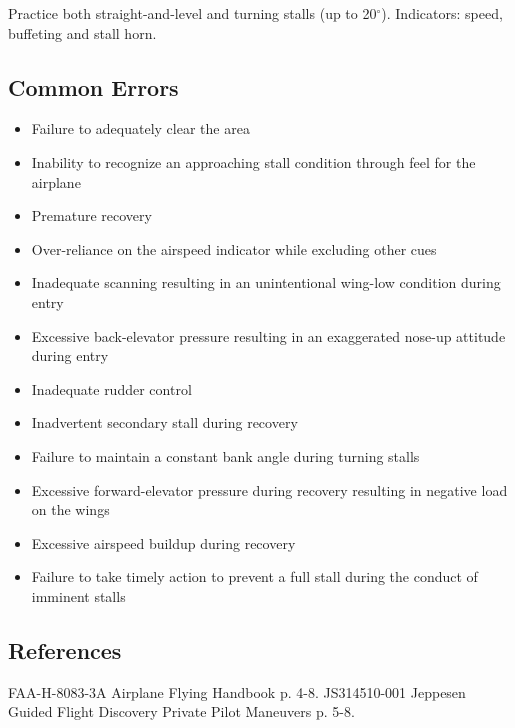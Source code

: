 Practice both straight-and-level and turning stalls (up to 20$^\circ$).
Indicators: speed, buffeting and stall horn.

\subsection{Common Errors}

\begin{itemize}
  \item Failure to adequately clear the area
  \item Inability to recognize an approaching stall condition through feel for
    the airplane
  \item Premature recovery
  \item Over-reliance on the airspeed indicator while excluding other cues
  \item Inadequate scanning resulting in an unintentional wing-low condition
    during entry
  \item Excessive back-elevator pressure resulting in an exaggerated nose-up
    attitude during entry
  \item Inadequate rudder control
  \item Inadvertent secondary stall during recovery
  \item Failure to maintain a constant bank angle during turning stalls
  \item Excessive forward-elevator pressure during recovery resulting in
    negative load on the wings
  \item Excessive airspeed buildup during recovery
  \item Failure to take timely action to prevent a full stall during the
    conduct of imminent stalls
\end{itemize}

\subsection{References}

FAA-H-8083-3A Airplane Flying Handbook p. 4-8.
JS314510-001 Jeppesen Guided Flight Discovery Private Pilot Maneuvers p. 5-8.

